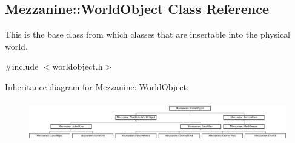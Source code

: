 \hypertarget{classMezzanine_1_1WorldObject}{
\subsection{Mezzanine::WorldObject Class Reference}
\label{classMezzanine_1_1WorldObject}
}


This is the base class from which classes that are insertable into the physical world.  




{\ttfamily \#include $<$worldobject.h$>$}

Inheritance diagram for Mezzanine::WorldObject:\begin{figure}[H]
\begin{center}
\leavevmode
\includegraphics[height=1.769352cm]{classMezzanine_1_1WorldObject}
\end{center}
\end{figure}
